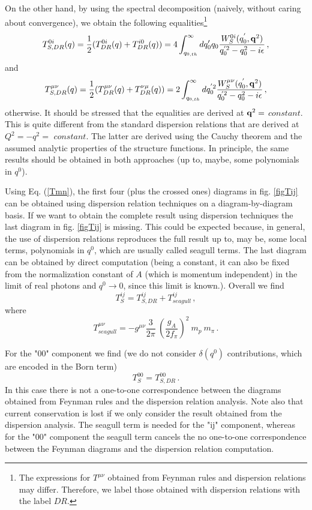 \documentclass[a4paper,12pt]{article}
\newcommand{\be}{\begin{equation}}
\newcommand{\ee}{\end{equation}}
\begin{document}
On the other hand, by using the spectral decomposition (naively, without caring about convergence), we obtain the following 
equalities\footnote{The expressions for $T^{\mu\nu}$ obtained from Feynman rules and dispersion relations 
may differ. Therefore, we label those obtained with dispersion relations with the label $DR$.}
\be
T_{S,DR}^{0i}(q)={1\over 2}(T_{DR}^{0i}(q)+T_{DR}^{i0}(q))
=
4\int_{q_{0,th}}^{\infty}
d q_0^{\prime} q_0 {W_S^{0i}(q_0^{'},{\bf q}^2) \over q_0^{'2}- q_0^{2}-i\epsilon}
\,,
\ee
and
\be
\label{Tmn}
T_{S,DR}^{\mu\nu}(q)={1\over 2}(T_{DR}^{\mu\nu}(q)+T_{DR}^{\nu\mu}(q))
=
2\int_{q_{0,th}}^{\infty}
d q_0^{'2} {W_S^{\mu\nu}(q_0^{'},{\bf q}^2) \over q_0^{'2}- q_0^{2}-i\epsilon}
\,,
\ee
otherwise. It should be stressed that the equalities are derived at ${\bf q}^2=$ $constant$. 
This is quite different from the standard dispersion relations that are derived 
at $Q^2=-q^2=$ $constant$. The latter are derived using the Cauchy theorem and 
the assumed analytic properties of the structure functions. In principle, the same results should 
be obtained in both approaches (up to, maybe, some polynomials in $q^0$). 

Using Eq. (\ref{Tmn}), the first four (plus the crossed ones) diagrams in fig. \ref{figTij} 
can be obtained using dispersion relation techniques on a diagram-by-diagram basis. If we 
want to obtain the complete result using dispersion techniques the last 
diagram in fig. \ref{figTij} is missing. This could be expected because, in general, the use of dispersion relations 
reproduces the full result up to, may be, some local terms, 
polynomials in $q^0$, which are usually called seagull terms. 
The last 
diagram can be obtained by direct computation (being a constant, it can also be 
fixed from the normalization constant of $A$ (which is momentum independent) 
in the limit of real photons and $q^0 \rightarrow 0$, since this limit 
is known.). Overall we find
\be
T_S^{ij}=T_{S,DR}^{ij}+T_{seagull}^{ij}
\,,
\ee
where
\be
T_{seagull}^{\mu\nu}
=
-g^{\mu\nu}\frac{3}{2\pi}\:\left(\frac{g_{A}}{2f_{\pi}}\right)^2\:m_{p}\:m_{\pi}
\,.
\ee

For the "00" component we find (we do not consider $\delta(q^0)$ contributions, 
which are encoded in the Born term)
\be
T_S^{00}=T_{S,DR}^{00}
\,.
\ee
In this case there is not a one-to-one correspondence between the diagrams obtained 
from Feynman rules and the dispersion relation analysis. 
Note also that current conservation is lost if we only consider the result obtained 
from the dispersion analysis. The seagull term is needed for the "ij" component, 
whereas for the "00" component the seagull term cancels the no one-to-one correspondence 
between the Feynman diagrams and the dispersion relation computation.
\end{document}
